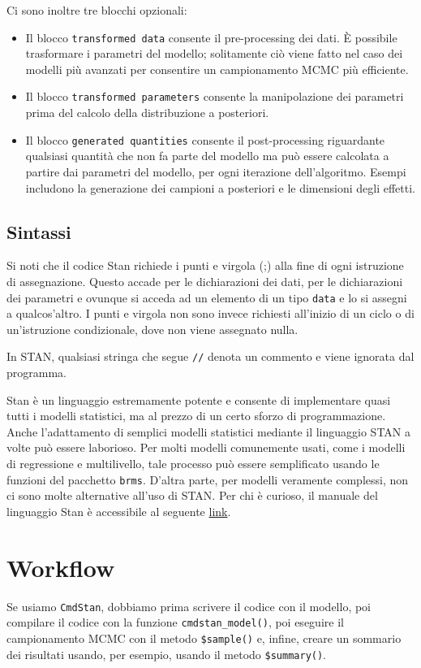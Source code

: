 \documentclass[
]{memoir}
\begin{document}
Ci sono inoltre tre blocchi opzionali:

\begin{itemize}
\item
  Il blocco \texttt{transformed\ data} consente il pre-processing dei dati. È possibile trasformare i parametri del modello; solitamente ciò viene fatto nel caso dei modelli più avanzati per consentire un campionamento MCMC più efficiente.
\item
  Il blocco \texttt{transformed\ parameters} consente la manipolazione dei parametri prima del calcolo della distribuzione a posteriori.
\item
  Il blocco \texttt{generated\ quantities} consente il post-processing riguardante qualsiasi quantità che non fa parte del modello ma può essere calcolata a partire dai parametri del modello, per ogni iterazione dell'algoritmo. Esempi includono la generazione dei campioni a posteriori e le dimensioni degli effetti.
\end{itemize}

\hypertarget{sintassi}{%
\subsection{Sintassi}\label{sintassi}}

Si noti che il codice Stan richiede i punti e virgola (;) alla fine di ogni istruzione di assegnazione. Questo accade per le dichiarazioni dei dati, per le dichiarazioni dei parametri e ovunque si acceda ad un elemento di un tipo \texttt{data} e lo si assegni a qualcos'altro. I punti e virgola non sono invece richiesti all'inizio di un ciclo o di un'istruzione condizionale, dove non viene assegnato nulla.

In STAN, qualsiasi stringa che segue \texttt{//} denota un commento e viene ignorata dal programma.

Stan è un linguaggio estremamente potente e consente di implementare quasi tutti i modelli statistici, ma al prezzo di un certo sforzo di programmazione. Anche l'adattamento di semplici modelli statistici mediante il linguaggio STAN a volte può essere laborioso. Per molti modelli comunemente usati, come i modelli di regressione e multilivello, tale processo può essere semplificato usando le funzioni del pacchetto \texttt{brms}. D'altra parte, per modelli veramente complessi, non ci sono molte alternative all'uso di STAN. Per chi è curioso, il manuale del linguaggio Stan è accessibile al seguente \href{https://mc-stan.org/docs/2_27/stan-users-guide/index.html}{link}.

\hypertarget{workflow}{%
\section{Workflow}\label{workflow}}

Se usiamo \texttt{CmdStan}, dobbiamo prima scrivere il codice con il modello, poi compilare il codice con la funzione \texttt{cmdstan\_model()}, poi eseguire il campionamento MCMC con il metodo \texttt{\$sample()} e, infine, creare un sommario dei risultati usando, per esempio, usando il metodo \texttt{\$summary()}.

  
\end{document}

